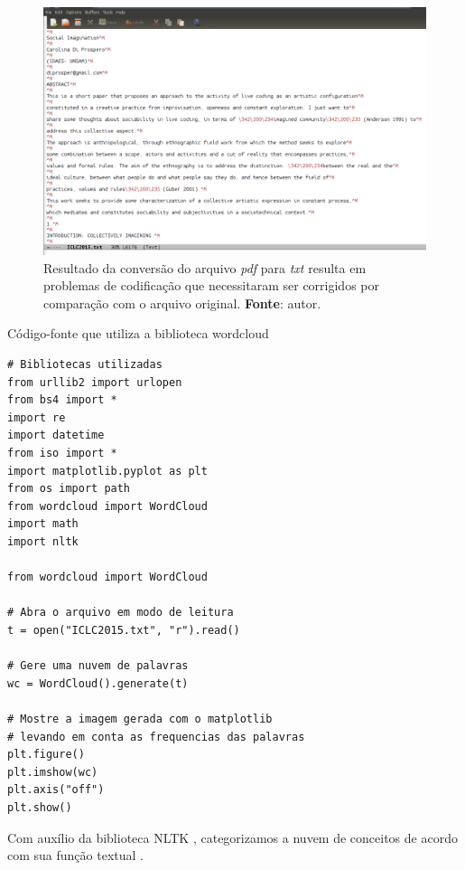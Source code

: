 \begin{figure}[!h]
  \centering
  \includegraphics[scale=0.3]{imagens/utf8.png}
  \caption{Resultado da conversão do arquivo \emph{pdf} para \emph{txt} resulta em problemas de codificação que necessitaram ser corrigidos por comparação com o arquivo original. \textbf{Fonte}: autor.}
  \label{fig:utf8}
\end{figure}


\begin{example}{Código-fonte que utiliza a biblioteca wordcloud}  
\begin{verbatim}
# Bibliotecas utilizadas
from urllib2 import urlopen
from bs4 import *
import re
import datetime
from iso import *
import matplotlib.pyplot as plt
from os import path
from wordcloud import WordCloud
import math
import nltk

from wordcloud import WordCloud
    
# Abra o arquivo em modo de leitura
t = open("ICLC2015.txt", "r").read()

# Gere uma nuvem de palavras
wc = WordCloud().generate(t)
    
# Mostre a imagem gerada com o matplotlib
# levando em conta as frequencias das palavras
plt.figure()
plt.imshow(wc)
plt.axis("off")
plt.show()
\end{verbatim}
\label{cod:nuvem}
\end{example}

Com auxílio da biblioteca NLTK  , categorizamos a nuvem de conceitos de acordo com sua função textual .

